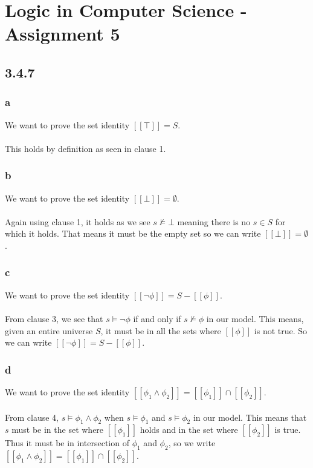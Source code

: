 \documentclass[12pt]{article}
\author{Nikolaj Dybdahl Rathcke}
\begin{document}
\section*{Logic in Computer Science - Assignment 5}
\subsection*{3.4.7}
\subsubsection*{a}
We want to prove the set identity $[[\top]]=S$.\\
\\
This holds by definition as seen in clause 1.

\subsubsection*{b}
We want to prove the set identity $[[\bot]]=\emptyset$.\\
\\
Again using clause 1, it holds as we see $s\not\models\bot$ meaning there is no $s\in S$ for which it holds. That means it must be the empty set so we can write $[[\bot]]=\emptyset$.

\subsubsection*{c}
We want to prove the set identity $[[\neg\phi]]=S-[[\phi]]$.\\
\\
From clause 3, we see that $s\models\neg\phi$ if and only if $s\not\models\phi$ in our model. This means, given an entire universe $S$, it must be in all the sets where $[[\phi]]$ is not true. So we can write $[[\neg\phi]]=S-[[\phi]]$.

\subsubsection*{d}
We want to prove the set identity $[[\phi_1\land\phi_2]]=[[\phi_1]]\cap [[\phi_2]]$.\\
\\
From clause 4, $s\models \phi_1\land\phi_2$ when $s\models\phi_1$ and $s\models\phi_2$ in our model. This means that $s$ must be in the set where $[[\phi_1]]$ holds and in the set where $[[\phi_2]]$ is true. Thus it must be in intersection of $\phi_1$ and $\phi_2$, so we write $[[\phi_1\land\phi_2]]=[[\phi_1]]\cap[[\phi_2]]$.
\end{document}
